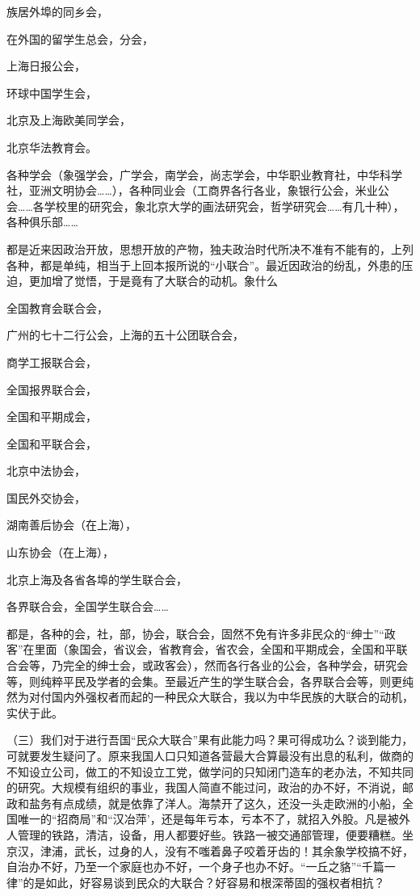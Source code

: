 族居外埠的同乡会，

在外国的留学生总会，分会，

上海日报公会，

环球中国学生会，

北京及上海欧美同学会，

北京华法教育会。

各种学会（象强学会，广学会，南学会，尚志学会，中华职业教育社，中华科学社，亚洲文明协会……），各种同业会（工商界各行各业，象银行公会，米业公会……各学校里的研究会，象北京大学的画法研究会，哲学研究会……有几十种），各种俱乐部……

都是近来因政治开放，思想开放的产物，独夫政治时代所决不准有不能有的，上列各种，都是单纯，相当于上回本报所说的“小联合”。最近因政治的纷乱，外患的压迫，更加增了觉悟，于是竟有了大联合的动机。象什么

全国教育会联合会，

广州的七十二行公会，上海的五十公团联合会，

商学工报联合会，

全国报界联合会，

全国和平期成会，

全国和平联合会，

北京中法协会，

国民外交协会，

湖南善后协会（在上海），

山东协会（在上海），

北京上海及各省各埠的学生联合会，

各界联合会，全国学生联合会……

都是，各种的会，社，部，协会，联合会，固然不免有许多非民众的“绅士”“政客”在里面（象国会，省议会，省教育会，省农会，全国和平期成会，全国和平联合会等，乃完全的绅士会，或政客会），然而各行各业的公会，各种学会，研究会等，则纯粹平民及学者的会集。至最近产生的学生联合会，各界联合会等，则更纯然为对付国内外强权者而起的一种民众大联合，我以为中华民族的大联合的动机，实伏于此。

（三）我们对于进行吾国“民众大联合”果有此能力吗？果可得成功么？谈到能力，可就要发生疑问了。原来我国人口只知道各营最大合算最没有出息的私利，做商的不知设立公司，做工的不知设立工党，做学问的只知闭门造车的老办法，不知共同的研究。大规模有组织的事业，我国人简直不能过问，政治的办不好，不消说，邮政和盐务有点成绩，就是依靠了洋人。海禁开了这久，还没一头走欧洲的小船，全国唯一的“招商局”和“汉冶萍’，还是每年亏本，亏本不了，就招入外股。凡是被外人管理的铁路，清洁，设备，用人都要好些。铁路一被交通部管理，便要糟糕。坐京汉，津浦，武长，过身的人，没有不嗤着鼻子咬着牙齿的！其余象学校搞不好，自治办不好，乃至一个家庭也办不好，一个身子也办不好。“一丘之貉”“千篇一律”的是如此，好容易谈到民众的大联合？好容易和根深蒂固的强权者相抗？

